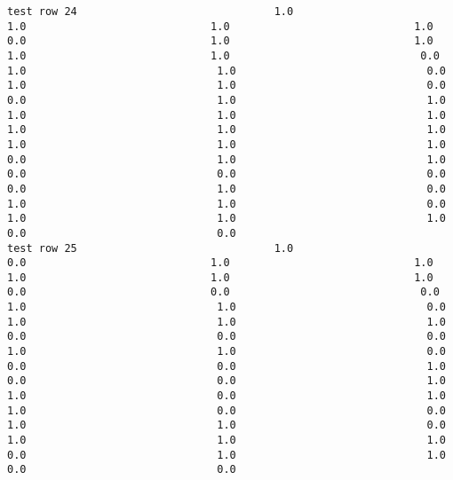 \documentclass[11pt]{article}
\begin{document}
\begin{verbatim}
test row 24                               1.0                             1.0                             1.0                             1.0                             0.0                             1.0                             1.0                             1.0                             1.0                              0.0                              1.0                              1.0                              0.0                              1.0                              1.0                              0.0                              0.0                              1.0                              1.0                              1.0                              1.0                              1.0                              1.0                              1.0                              1.0                              1.0                              1.0                              1.0                              0.0                              1.0                              1.0                              0.0                              0.0                              0.0                              0.0                              1.0                              0.0                              1.0                              1.0                              0.0                              1.0                              1.0                              1.0                              0.0                              0.0
test row 25                               1.0                             0.0                             1.0                             1.0                             1.0                             1.0                             1.0                             0.0                             0.0                              0.0                              1.0                              1.0                              0.0                              1.0                              1.0                              1.0                              0.0                              0.0                              0.0                              1.0                              1.0                              0.0                              0.0                              0.0                              1.0                              0.0                              0.0                              1.0                              1.0                              0.0                              1.0                              1.0                              0.0                              0.0                              1.0                              1.0                              0.0                              1.0                              1.0                              1.0                              0.0                              1.0                              1.0                              0.0                              0.0

\end{verbatim}
\end{document}
